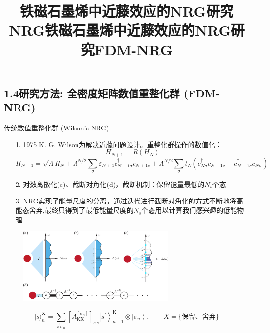 \documentclass[9pt,t]{beamer} %
\begin{document}
\subsection{1.4研究方法: 全密度矩阵数值重整化群 (FDM-NRG)}
\title{铁磁石墨烯中近藤效应的NRG研究\qquad \qquad \qquad \qquad NRG}
\begin{frame}{传统数值重整化群 (Wilson's NRG)}
\begin{itemize}
\setlength\itemsep{0.4em}
\item[1.] 1975 K. G. Wilson为解决近藤问题设计。重整化群操作的数值化：
\[
H_{N+1}=R\left(H_{N}\right)
\]
\[
 H_{N+1}= \sqrt{\Lambda} H_{N}+\Lambda^{N / 2} \sum_{\sigma} \varepsilon_{N+1} c_{N+1 \sigma}^{\dagger} c_{N+1 \sigma} +\Lambda^{N / 2} \sum_{\sigma} t_{N}\left(c_{N \sigma}^{\dagger} c_{N+1 \sigma}+c_{N+1 \sigma}^{\dagger} c_{N \sigma}\right)
\]
\item[2.] 对数离散化(c)、截断对角化(d)，截断机制：保留能量最低的$N_{s}$个态
\item[3.] NRG实现了能量尺度的分离，通过迭代进行截断对角化的方式不断地将高能态舍弃,最终只得到了最低能量尺度的$N_{s}$个态用以计算我们感兴趣的低能物理
\end{itemize}
\begin{figure}
\includegraphics[width=0.7\textwidth,height=0.29\textwidth]{NRGmapping.png}
\end{figure}
\[
|s\rangle_{n}^{\mathrm{X}}=\sum_{s^{\prime} \sigma_{n}}\left[A_{\mathrm{KX}}^{\left[\sigma_{n}\right]}\right]_{s^{\prime} s}\left|s^{\prime}\right\rangle_{n-1}^{\mathrm{K}} \otimes\left|\sigma_{n}\right\rangle , \qquad X=\{\text{保留、舍弃}\}
\]

\end{frame}
\title{铁磁石墨烯中近藤效应的NRG研究\qquad \qquad \qquad \qquad FDM-NRG}
\end{document}
